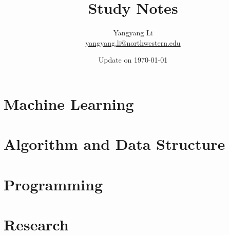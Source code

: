 \documentclass{scinote}
\begin{document}
\title{\bf \huge Study Notes}
\author{Yangyang Li \\ \href{mailto:yangyang.li@northwestern.edu}{yangyang.li@northwestern.edu}}

\date{Update on \today}
\maketitle
\setcounter{tocdepth}{2}
\setcounter{minitocdepth}{1}

\begin{multicols}{2}
	\dominitoc%
	\adjustmtc[2]%
	\tableofcontents
	\label{toc-contents}
\end{multicols}

\listoffigures
\begin{multicols}{2}
	\listoftheorems[ignoreall,show={theorem}]
\end{multicols}

\renewcommand{\listtheoremname}{List of Definitions}
\begin{multicols}{2}
	\listoftheorems[ignoreall,show={definition}]
\end{multicols}

\printglossaries




\part{Machine Learning}


\part{Algorithm and Data Structure}


\part{Programming}



\part{Research}



\begin{appendices}
	
\end{appendices}

\backmatter


\printbibliography[heading=bibintoc]
\printindex
\end{document}
